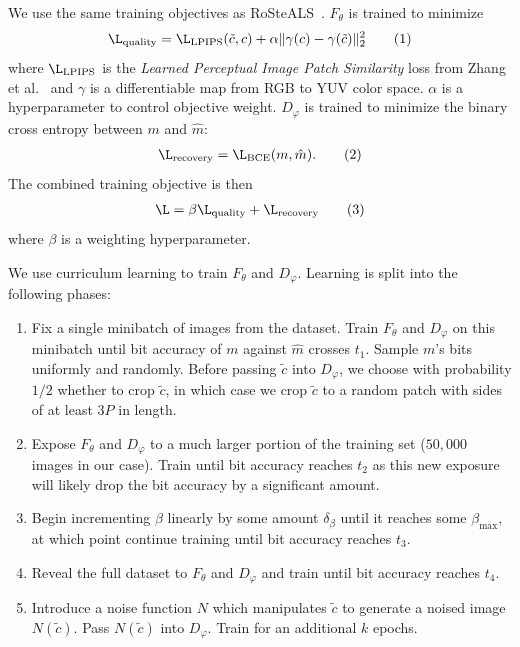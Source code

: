 \documentclass[twocolumn]{article}
\begin{document}
We use the same training objectives as RoSteALS~\cite{bui2023rosteals}. $F_\theta$ is trained to minimize
\begin{align*}
	\L_{\mathrm{quality}} = \L_{\mathrm{LPIPS}}(\tilde c, c) + \alpha \Vert\gamma(c) - \gamma(\tilde c)\Vert_2^2\tag{1}
\end{align*}
where $\L_{\mathrm{LPIPS}}$ is the \textit{Learned Perceptual Image Patch Similarity} loss from Zhang et al.~\cite{zhang2018lpips} and $\gamma$ is a differentiable map from RGB to YUV color space. $\alpha$ is a hyperparameter to control objective weight. $D_\varphi$ is trained to minimize the binary cross entropy between $m$ and $\hat m$:
\begin{align*}
	\L_{\mathrm{recovery}} = \L_{\mathrm{BCE}}(m, \hat m).\tag{2}
\end{align*}
The combined training objective is then
\begin{align*}
	\L = \beta \L_{\mathrm{quality}} + \L_{\mathrm{recovery}}\tag{3}
\end{align*}
where $\beta$ is a weighting hyperparameter.




We use curriculum learning to train $F_\theta$ and $D_\varphi$. Learning is split into the following phases:
\begin{enumerate}
	\item Fix a single minibatch of images from the dataset. Train $F_\theta$ and $D_\varphi$ on this minibatch until bit accuracy of $m$ against $\hat m$ crosses $t_1$. Sample $m$'s bits uniformly and randomly. Before passing $\tilde c$ into $D_\varphi$, we choose with probability $1/2$ whether to crop $\tilde c$, in which case we crop $\tilde c$ to a random patch with sides of at least $3P$ in length.
	\item Expose $F_\theta$ and $D_\varphi$ to a much larger portion of the training set ($50{,}000$ images in our case). Train until bit accuracy reaches $t_2$ as this new exposure will likely drop the bit accuracy by a significant amount.
	\item Begin incrementing $\beta$ linearly by some amount $\delta_\beta$ until it reaches some $\beta_{\mathrm{max}}$, at which point continue training until bit accuracy reaches $t_3$.
	\item Reveal the full dataset to $F_\theta$ and $D_\varphi$ and train until bit accuracy reaches $t_4$.
	\item Introduce a noise function $N$ which manipulates $\tilde c$ to generate a noised image $N(\tilde c)$. Pass $N(\tilde c)$ into $D_\varphi$. Train for an additional $k$ epochs.
\end{enumerate}
\end{document}
